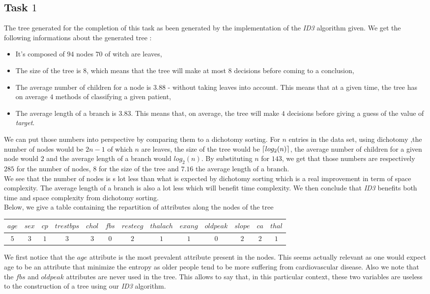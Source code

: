 \documentclass[french]{article}
\DeclarePairedDelimiter\ceil{\lceil}{\rceil}
\begin{document}
\subsection{Task $1$}
	The tree generated for the completion of this task as been generated by the implementation of the \emph{ID3} algorithm given. We get the following informations about the generated tree :
	\begin{itemize}
		\item It's composed of $94$ nodes $70$ of witch are leaves,
		\item The size of the tree is 8, which means that the tree will make at most $8$ decisions before coming to a conclusion,
		\item The average number of children for a node is $3.88$ - without taking leaves into account. This means that at a given time, the tree has on average $4$ methods of classifying a given patient,
		\item The average length of a branch is $3.83$.  This means that, on average, the tree will make $4$ decisions before giving a guess of the value of \emph{target}.
	\end{itemize}
	We can put those numbers into perspective by comparing them to a dichotomy sorting. For $n$ entries in the data set, using dichotomy ,the number of nodes would be $2n-1$ of which $n$ are leaves, the size of the tree would be $\ceil*{log_2(n)}$, the average number of children for a given node would $2$ and the average length of a branch would $log_2(n)$. By substituting $n$ for $143$, we get that those numbers are respectively $285$ for the number of nodes, $8$ for the size of the tree and $7.16$ the average length of a branch.\\
	We see that the number of nodes is s lot less than what is expected by dichotomy sorting which is a real improvement in term of space complexity. The average length of a branch is also a lot less which will benefit time complexity. We then conclude that \emph{ID3} benefits both time and space complexity from dichotomy sorting.\\
	Below, we give a table containing the repartition of attributes along the nodes of the tree
	\begin{center}
		\begin{tabular}{ |c|c|c|c|c|c|c|c|c|c|c|c|c| }
			\hline
			$age$ & $sex$ & $cp$ & $trestbps$ & $chol$ & $fbs$ & $restecg$ & $thalach$ & $exang$ & $oldpeak$ & $slope$ & $ca$ & $thal$\\
			\hline
			$5$ & $3$ & $1$ & $3$ & $3$ & $0$ & $2$ & $1$ & $1$ & $0$ & $2$  & $2$ & $1$\\
			\hline
		\end{tabular}
	\end{center}
	We first notice that the $age$ attribute is the most prevalent attribute present in the nodes. This seems actually relevant as one would expect age to be an attribute that minimize the entropy as older people tend to be more suffering from cardiovascular disease. Also we note that the $fbs$ and $oldpeak$ attributes are never used in the tree. This allows to say that, in this particular context, these two variables are useless to the construction of a tree using our \emph{ID3} algorithm.
		
\end{document}

